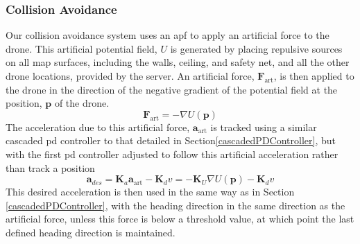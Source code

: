 \documentclass{report_template_oxford}
\begin{document}
\subsubsection{Collision Avoidance}
Our collision avoidance system uses an \gls{apf} to apply an artificial force to the drone. This artificial potential field, $U$ is generated by placing repulsive sources on all map surfaces, including the walls, ceiling, and safety net, and all the other drone locations, provided by the server. An artificial force, $\mathbf{F}_{\mathrm{art}}$, is then applied to the drone in the direction of the negative gradient of the potential field at the position, $\mathbf{p}$ of the drone.
\begin{equation}
    \mathbf{F}_{\mathrm{art}} = - \nabla U(\mathbf{p})
\end{equation}
The acceleration due to this artificial force, $\mathbf{a}_{\mathrm{art}}$ is tracked using a similar cascaded \gls{pd} controller to that detailed in Section\ref{cascadedPDController}, but with the first \gls{pd} controller adjusted to follow this artificial acceleration rather than track a position
\begin{equation}
    \mathbf{a}_{des} = \mathbf{K}_a \mathbf{a}_{\mathrm{art}} - \mathbf{K}_d v = - \mathbf{K}_U \nabla U(\mathbf{p}) - \mathbf{K}_d v
\end{equation}
This desired acceleration is then used in the same way as in Section \ref{cascadedPDController}, with the heading direction in the same direction as the artificial force, unless this force is below a threshold value, at which point the last defined heading direction is maintained.
\end{document}
